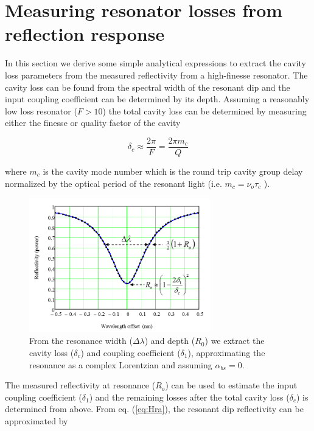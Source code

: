 \documentclass[10pt]{article}
\begin{document}
\section{Measuring resonator losses from reflection response}

In this section we derive some simple analytical expressions to extract the cavity loss parameters from the measured reflectivity from a high-finesse resonator.   The cavity loss can be found from the spectral width of the resonant dip and the input coupling coefficient can be determined by its depth.   Assuming a reasonably low loss resonator ($F>10$) the  total cavity loss can be determined by measuring either the finesse or quality factor of the cavity 


\begin{equation} 
\delta_c \approx \frac{2\pi}{F} = \frac{2 \pi m_c}{Q}
\end{equation}

\noindent  where $m_c$ is the cavity mode number which is the round trip cavity group delay normalized by the optical period of the resonant light (i.e.  $m_c = \nu_o \tau_c$ ).




\begin{figure}[htbp]
\centering\includegraphics[width=0.7\textwidth]{figures/dip}
\caption{From the resonance width ($ \Delta \lambda $) and depth ($ R_0 $) we extract the cavity loss ($ \delta_c $) and coupling coefficient ($ \delta_1 $), approximating the resonance as a complex Lorentzian and assuming $\alpha_{bs} = 0$.}
\label{fig:dip}
\end{figure}



The measured  reflectivity at resonance ($R_o$)   can be used to estimate the input coupling coefficient ($\delta_1$) and the remaining losses  after the total cavity loss ($\delta_c$) is determined from above.
From eq. (\ref{eq:Hra}), the resonant dip reflectivity can be approximated by
\end{document}
